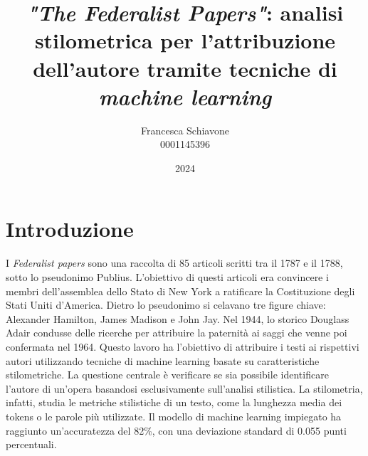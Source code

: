 \documentclass[a4paper, 12pt]{article}
\title{\textbf{\textit{"The Federalist Papers"}: analisi stilometrica per l'attribuzione dell'autore tramite tecniche di \textit{machine learning}}}
\author{Francesca Schiavone\\
0001145396}
\date{2024}
\begin{document}
	
\maketitle
	
\section{\textbf{Introduzione}}
I \textit{Federalist papers} sono una raccolta di 85 articoli scritti tra il 1787 e il 1788, sotto lo pseudonimo Publius. L'obiettivo di questi articoli era convincere i membri dell'assemblea dello Stato di New York a ratificare la Costituzione degli Stati Uniti d'America. Dietro lo pseudonimo si celavano tre figure chiave: Alexander Hamilton, James Madison e John Jay. 
Nel 1944, lo storico Douglass Adair condusse delle ricerche per attribuire la paternità ai saggi che venne poi confermata nel 1964. 
Questo lavoro ha l'obiettivo di attribuire i testi ai rispettivi autori utilizzando tecniche di machine learning basate su caratteristiche stilometriche. La questione centrale è verificare se sia possibile identificare l'autore di un'opera basandosi esclusivamente sull'analisi stilistica. La stilometria, infatti, studia le metriche stilistiche di un testo, come la lunghezza media dei tokens o le parole più utilizzate. 
Il modello di machine learning impiegato ha raggiunto un'accuratezza del 82\%, con una deviazione standard di 0.055 punti percentuali.
\end{document}
